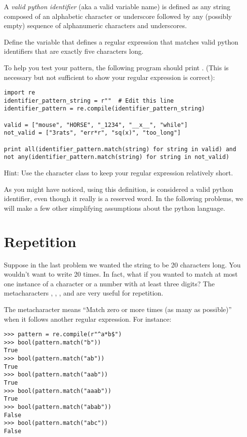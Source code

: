 \begin{problem}
A \emph{valid python identifier} (aka a valid variable name) is defined as any string composed of an alphabetic character or underscore followed by any (possibly empty) sequence of alphanumeric characters and underscores.

Define the variable  that defines a regular expression that matches valid python identifiers that are exactly five characters long.

To help you test your pattern, the following program should print \mbox{.} (This is necessary but not sufficient to show your regular expression is correct):
\begin{lstlisting}
import re
identifier_pattern_string = r""  # Edit this line
identifier_pattern = re.compile(identifier_pattern_string)

valid = ["mouse", "HORSE", "_1234", "__x__", "while"]
not_valid = ["3rats", "err*r", "sq(x)", "too_long"]

print all(identifier_pattern.match(string) for string in valid) and not any(identifier_pattern.match(string) for string in not_valid)
\end{lstlisting}

Hint: Use the  character class to keep your regular expression relatively short.
\begin{info}
As you might have noticed, using this definition,  is considered a valid python identifier, even though it really is a reserved word. In the following problems, we will make a few other simplifying assumptions about the python language.
\end{info}
\end{problem}

\section*{Repetition}
Suppose in the last problem we wanted the string to be 20 characters long.
You wouldn't want to write \li{\\w} 20 times.
In fact, what if you wanted to match at most one instance of a character or a number with at least three digits?
The metacharacters , , , and  are very useful for repetition.

The  metacharacter means ``Match zero or more times (as many as possible)'' when it follows another regular expression.
For instance:
\begin{lstlisting}
>>> pattern = re.compile(r"^a*b$")
>>> bool(pattern.match("b"))
True
>>> bool(pattern.match("ab"))
True
>>> bool(pattern.match("aab"))
True
>>> bool(pattern.match("aaab"))
True
>>> bool(pattern.match("abab"))
False
>>> bool(pattern.match("abc"))
False
\end{lstlisting}

